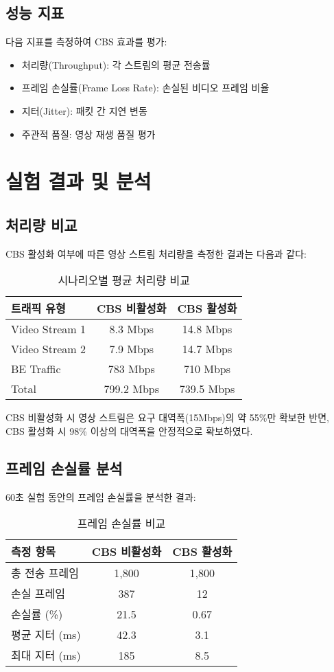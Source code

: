\documentclass[10pt,twocolumn]{article}
\begin{document}
\subsection{성능 지표}
다음 지표를 측정하여 CBS 효과를 평가:
\begin{itemize}
\item 처리량(Throughput): 각 스트림의 평균 전송률
\item 프레임 손실률(Frame Loss Rate): 손실된 비디오 프레임 비율
\item 지터(Jitter): 패킷 간 지연 변동
\item 주관적 품질: 영상 재생 품질 평가
\end{itemize}

\section{실험 결과 및 분석}

\subsection{처리량 비교}
CBS 활성화 여부에 따른 영상 스트림 처리량을 측정한 결과는 다음과 같다:

\begin{table}[h]
\centering
\caption{시나리오별 평균 처리량 비교}
\begin{tabular}{lcc}
\toprule
트래픽 유형 & CBS 비활성화 & CBS 활성화 \\
\midrule
Video Stream 1 & 8.3 Mbps & 14.8 Mbps \\
Video Stream 2 & 7.9 Mbps & 14.7 Mbps \\
BE Traffic & 783 Mbps & 710 Mbps \\
Total & 799.2 Mbps & 739.5 Mbps \\
\bottomrule
\end{tabular}
\end{table}

CBS 비활성화 시 영상 스트림은 요구 대역폭(15Mbps)의 약 55\%만 확보한 반면, CBS 활성화 시 98\% 이상의 대역폭을 안정적으로 확보하였다.

\subsection{프레임 손실률 분석}
60초 실험 동안의 프레임 손실률을 분석한 결과:

\begin{table}[h]
\centering
\caption{프레임 손실률 비교}
\begin{tabular}{lcc}
\toprule
측정 항목 & CBS 비활성화 & CBS 활성화 \\
\midrule
총 전송 프레임 & 1,800 & 1,800 \\
손실 프레임 & 387 & 12 \\
손실률 (\%) & 21.5 & 0.67 \\
평균 지터 (ms) & 42.3 & 3.1 \\
최대 지터 (ms) & 185 & 8.5 \\
\bottomrule
\end{tabular}
\end{table}
\end{document}

